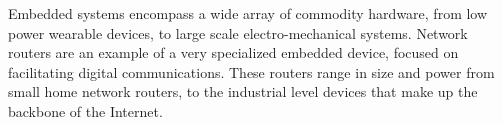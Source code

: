 Embedded systems encompass a wide array of commodity hardware, from low power wearable devices, to large scale electro-mechanical systems. Network routers are an example of a very specialized embedded device, focused on facilitating digital communications. These routers range in size and power from small home network routers, to the industrial level devices that make up the backbone of the Internet. 